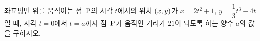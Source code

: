 좌표평면 위를 움직이는 점~$\mathrm{P}$의 시각 $t$에서의 위치 $(x{,}\mkern3mu\mathopen{}y)$가 $x=2t^2+1$, $y=\dfrac{1}{3}t^3-4t$일 때, 시각 $t=0$에서 $t=a$까지 점~$\mathrm{P}$가 움직인 거리가 $21$이 되도록 하는 양수 $a$의 값을 구하시오.
